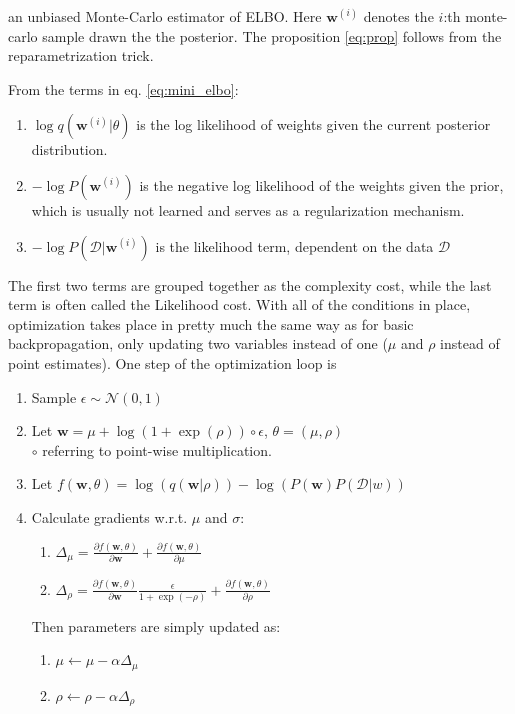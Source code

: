 	an unbiased Monte-Carlo estimator of ELBO. Here $\pmb{w}^{(i)}$ denotes the $i$:th monte-carlo sample drawn the the posterior. The proposition \ref{eq:prop} follows from the reparametrization trick.
	
	From the terms in eq. \ref{eq:mini_elbo}:
	\begin{enumerate}
		\item $\log q(\pmb{w}^{(i)}|\theta)$ is the log likelihood of weights given the current posterior distribution.
		
		\item $-\log P(\pmb{w}^{(i)})$ is the negative log likelihood of the weights given the prior, which is usually not learned and serves as a regularization mechanism. 
		
		\item $- \log P(\mathcal{D}|\pmb{w}^{(i)})$ is the likelihood term, dependent on the data $\mathcal{D}$
	\end{enumerate}
	
	\vspace*{2mm}
	The first two terms are grouped together as the complexity cost, while the last term is often called the Likelihood cost. With all of the conditions in place, optimization takes place in pretty much the same way as for basic backpropagation, only updating two variables instead of one ($\mu$ and $\rho$ instead of point estimates). One step of the optimization loop is 
	
	\begin{enumerate}
		\item Sample $\epsilon \sim \mathcal{N}(0,1)$
		\item Let  $ \pmb{w} = \mu + \log(1 + \exp(\rho)) \circ  \epsilon$, $\theta = (\mu, \rho)$ \\ $\circ$ referring to point-wise multiplication.
		\item Let $f(\pmb{w}, \theta) = \log(q(\pmb{w}|\rho)) - \log(P(\pmb{w})P(\mathcal{D}|w))$
		\item Calculate gradients w.r.t. $\mu$ and $\sigma$:
		\begin{enumerate}
			\item $\Delta_\mu  = \frac{\partial f(\pmb{w},\theta)}{\partial \pmb{w}} + 
			\frac{\partial f(\pmb{w},\theta)}{\partial \mu}$ 
			
			\item $\Delta_\rho  = \frac{\partial f(\pmb{w},\theta)}{\partial \pmb{w}}\frac{\epsilon}{1 + \exp(-\rho)} +
			\frac{\partial f(\pmb{w},\theta)}{\partial \rho}$
		\end{enumerate}
		Then parameters are simply updated as:
		\begin{enumerate}
			\item $\mu \leftarrow \mu - \alpha \Delta_\mu$
			\item $\rho \leftarrow \rho - \alpha \Delta_\rho$ 
		\end{enumerate}
	\end{enumerate}
	

